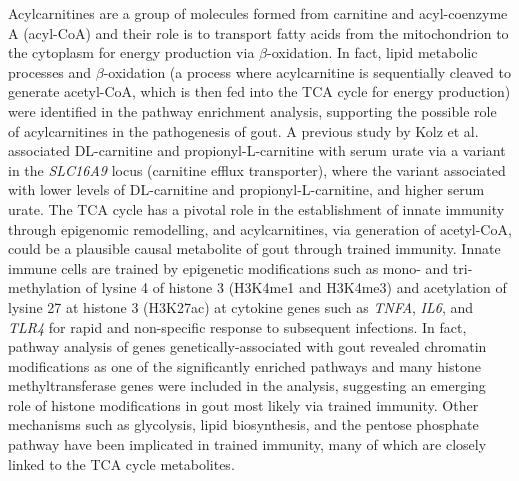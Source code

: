 \documentclass[a4paper,10pt]{article}
\begin{document}
Acylcarnitines are a group of molecules formed from carnitine and acyl-coenzyme A (acyl-CoA) and their role is to transport fatty acids from the mitochondrion to the cytoplasm for energy production via $\beta$-oxidation.
In fact, lipid metabolic processes and $\beta$-oxidation (a process where acylcarnitine is sequentially cleaved to generate acetyl-CoA, which is then fed into the TCA cycle for energy production) were identified in the pathway enrichment analysis, supporting the possible role of acylcarnitines in the pathogenesis of gout.
A previous study by Kolz et al.\citep{kolz_meta-analysis_2009-2} associated DL-carnitine and propionyl-L-carnitine with serum urate via a variant in the \textit{SLC16A9} locus (carnitine efflux transporter), where the variant associated with lower levels of DL-carnitine and propionyl-L-carnitine, and higher serum urate.
The TCA cycle has a pivotal role in the establishment of innate immunity\citep{van_der_heijden_epigenetics_2018,arts_immunometabolic_2016,arts_glutaminolysis_2016} through epigenomic remodelling, and acylcarnitines, via generation of acetyl-CoA, could be a plausible causal metabolite of gout through trained immunity.
Innate immune cells are trained by epigenetic modifications such as mono- and tri-methylation of lysine 4 of histone 3 (H3K4me1 and H3K4me3) and acetylation of lysine 27 at histone 3 (H3K27ac) at cytokine genes such as \textit{TNFA}, \textit{IL6}, and \textit{TLR4} for rapid and non-specific response to subsequent infections\citep{saeed_epigenetic_2014,van_der_heijden_epigenetics_2018}.
In fact, pathway analysis of genes genetically-associated with gout\citep{major_genome-wide_2024} revealed chromatin modifications as one of the significantly enriched pathways and many histone methyltransferase genes were included in the analysis, suggesting an emerging role of histone modifications in gout most likely via train\-ed immunity.
Other mechanisms such as glycolysis\citep{arts_immunometabolic_2016}, lipid biosynthesis\citep{bekkering_metabolic_2018}, and the pentose phosphate pathway\citep{arts_immunometabolic_2016,arts_glutaminolysis_2016} have been implicated in trained immunity, many of which are closely linked to the TCA cycle metabolites.
\end{document}
